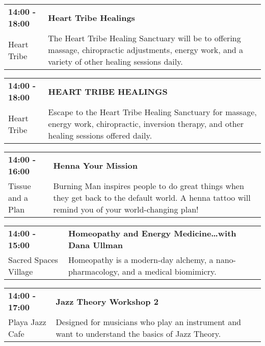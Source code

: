 \begin{tabular}{ p{1in} p{2.2in} }
    \textbf{14:00 - 18:00} & \textbf{Heart Tribe Healings} \\
    Heart Tribe \newline  & The Heart Tribe Healing Sanctuary will be to offering massage, chiropractic adjustments, energy work, and a variety of other healing sessions daily. \\
    \hline 
\end{tabular}
    
\begin{tabular}{ p{1in} p{2.2in} }
    \textbf{14:00 - 18:00} & \textbf{HEART TRIBE HEALINGS} \\
    Heart Tribe \newline  & Escape to the Heart Tribe Healing Sanctuary for massage, energy work, chiropractic, inversion therapy, and other healing sessions offered daily. \\
    \hline 
\end{tabular}
    
\begin{tabular}{ p{1in} p{2.2in} }
    \textbf{14:00 - 16:00} & \textbf{Henna Your Mission} \\
    Tissue and a Plan \newline  & Burning Man inspires people to do great things when they get back to the default world. A henna tattoo will remind you of your world-changing plan! \\
    \hline 
\end{tabular}
    
\begin{tabular}{ p{1in} p{2.2in} }
    \textbf{14:00 - 15:00} & \textbf{Homeopathy and Energy Medicine\ldots with Dana Ullman} \\
    Sacred Spaces Village \newline  & Homeopathy is a modern-day alchemy, a nano-pharmacology, and a medical biomimicry. \\
    \hline 
\end{tabular}
    
\begin{tabular}{ p{1in} p{2.2in} }
    \textbf{14:00 - 17:00} & \textbf{Jazz Theory Workshop 2} \\
    Playa Jazz Cafe \newline  & Designed for musicians who play an instrument and want to understand the basics of Jazz Theory. \\
    \hline 
\end{tabular}
    
